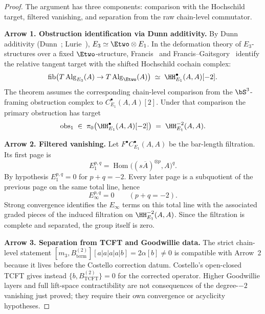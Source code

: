 \begin{proof}
The argument has three components: comparison with the Hochschild target,
filtered vanishing, and separation from the raw chain-level commutator.

\smallskip\noindent\textbf{Arrow 1. Obstruction identification via Dunn additivity.}
By Dunn additivity (Dunn~\cite{Dunn1988}; Lurie~\cite[Theorem~5.1.2.2]{LurieHA}), $E_3 \simeq \Etwo \otimes E_1$. In the deformation theory of $E_3$-structures over a fixed $\Etwo$-structure, Francis~\cite[Theorem~4.1]{Francis2013} and Francis--Gaitsgory~\cite[Theorem~3.3.1]{FrancisGaitsgory2012} identify the relative tangent target with the shifted Hochschild cochain complex:
\[
 \mathrm{fib}\bigl(T\,\mathrm{Alg}_{E_3}(A) \to T\,\mathrm{Alg}_{\Etwo}(A)\bigr) \;\simeq\; \HH^\bullet_{E_1}(A, A)[-2].
\]
The theorem assumes the corresponding chain-level comparison from the
$\bS^3$-framing obstruction complex to $C^\bullet_{E_1}(A,A)[2]$. Under
that comparison the primary obstruction has target
\[
 \mathrm{obs}_1 \;\in\; \pi_0\bigl(\HH^\bullet_{E_1}(A, A)[-2]\bigr) \;=\; \HH^{-2}_{E_1}(A, A).
\]

\smallskip\noindent\textbf{Arrow 2. Filtered vanishing.}
Let $F^\bullet C^\bullet_{E_1}(A,A)$ be the bar-length filtration. Its
first page is
\[
 E_1^{p,q}=\operatorname{Hom}\bigl((s\overline A)^{\otimes p},A\bigr)^q .
\]
By hypothesis $E_1^{p,q}=0$ for $p+q=-2$. Every later page is a
subquotient of the previous page on the same total line, hence
\[
 E_\infty^{p,q}=0\qquad(p+q=-2).
\]
Strong convergence identifies the $E_\infty$ terms on this total line
with the associated graded pieces of the induced filtration on
$\HH^{-2}_{E_1}(A,A)$. Since the filtration is complete and separated,
the group itself is zero.

\smallskip\noindent\textbf{Arrow 3. Separation from TCFT and Goodwillie data.}
The strict chain-level statement
$[m_3,B^{(2)}_{\mathrm{term}}][a|a|a|a|b]=2\alpha[b]\neq0$ is compatible
with Arrow~2 because it lives before the Costello correction datum.
Costello's open-closed TCFT gives instead
$\{b,B^{(2)}_{\mathrm{TCFT}}\}=0$ for the corrected operator. Higher
Goodwillie layers and full lift-space contractibility are not
consequences of the degree-$-2$ vanishing just proved; they require their
own convergence or acyclicity hypotheses.
\end{proof}


